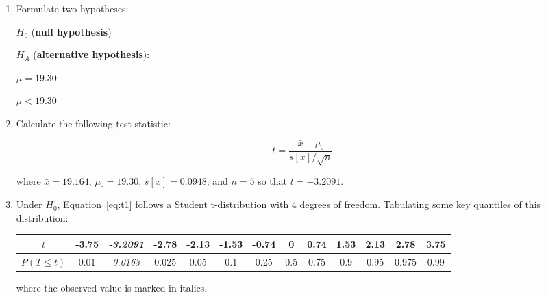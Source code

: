 \begin{enumerate}
\item  Formulate two hypotheses:\medskip

  \noindent\begin{minipage}{.4\textwidth}
    $H_0$ (\textbf{null hypothesis})
    
    \vspace{1em}
    
    $H_{\!A}$ (\textbf{alternative hypothesis}):
  \end{minipage}
  \begin{minipage}{.2\textwidth}
  \end{minipage}
  \begin{minipage}{.2\textwidth}
    $\mu=19.30$
    
    \vspace{1em}
    
    $\mu<{19.30}$
  \end{minipage}
  \begin{minipage}{.2\textwidth}
  \end{minipage}
  
\item Calculate the following test statistic:

  \begin{equation}
    t = \frac{\bar{x} - \mu_\circ}{s[x]/\sqrt{n}}
    \label{eq:t1}
  \end{equation}

  \noindent where $\bar{x} = 19.164$, $\mu_\circ = 19.30$, 
  $s[x] = 0.0948$, and $n = 5$ so that $t = -3.2091$.

\item Under $H_0$, Equation~\ref{eq:t1} follows a Student
  t-distribution with 4 degrees of freedom. Tabulating some key
  quantiles of this distribution:

  \begin{center}
    \begin{tabular}{c|c@{\gap}c@{\gap}c@{\gap}c@{\gap}
        c@{\gap}c@{\gap}c@{\gap}c@{\gap}c@{\gap}c@{\gap}c@{\gap}c}
      $t$ & -3.75 & \textit{-3.2091} & -2.78 & -2.13 & -1.53 & -0.74 &
      0 & 0.74 & 1.53 & 2.13 & 2.78 & 3.75 \\ \hline
      $P(T\leq{t})$ & 0.01 & \textit{0.0163} & 0.025 & 0.05 & 0.1 & 0.25 &
      0.5 & 0.75 & 0.9 & 0.95 & 0.975 & 0.99
    \end{tabular}
  \end{center}

  \noindent where the observed value is marked in italics.
  

\end{enumerate}
